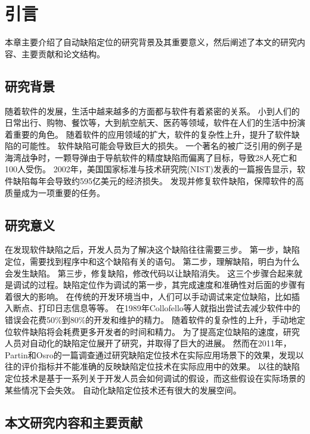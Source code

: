 \chapter{引言}

本章主要介绍了自动缺陷定位的研究背景及其重要意义，然后阐述了本文的研究内容、主要贡献和论文结构。

\section{研究背景}

随着软件的发展，生活中越来越多的方面都与软件有着紧密的关系。
小到人们的日常出行、购物、餐饮等，大到航空航天、医药等领域，软件在人们的生活中扮演着重要的角色。
随着软件的应用领域的扩大，软件的复杂性上升，提升了软件缺陷的可能性。
软件缺陷可能会导致巨大的损失。
一个著名的被广泛引用的例子是海湾战争时，一颗导弹由于导航软件的精度缺陷而偏离了目标，导致28人死亡和100人受伤\parencite{Zou2015A}。
2002年，美国国家标准与技术研究院(NIST)发表的一篇报告\parencite{NIST2002The}显示，软件缺陷每年会导致约595亿美元的经济损失。
发现并修复软件缺陷，保障软件的高质量成为一项重要的任务。

\section{研究意义}

在发现软件缺陷之后，开发人员为了解决这个缺陷往往需要三步\parencite{Parnin2011Are}。
第一步，缺陷定位，需要找到程序中和这个缺陷有关的语句。
第二步，理解缺陷，明白为什么会发生缺陷。
第三步，修复缺陷，修改代码以让缺陷消失。
这三个步骤合起来就是调试的过程。缺陷定位作为调试的第一步，其完成速度和准确性对后面的步骤有着很大的影响。
在传统的开发环境当中，人们可以手动调试来定位缺陷，比如插入断点、打印日志信息等等。
在1989年Collofello等人就指出尝试去减少软件中的错误会花费50\%到80\%的开发和维护的精力\parencite{Collofello1989Evaluating}。
随着软件的复杂性的上升，手动地定位软件缺陷将会耗费更多开发者的时间和精力。
为了提高定位缺陷的速度，研究人员对自动化的缺陷定位展开了研究，并取得了巨大的进展。
然而在2011年，Partin和Osro的一篇调查\parencite{Parnin2011Are}通过研究缺陷定位技术在实际应用场景下的效果，发现以往的评价指标并不能准确的反映缺陷定位技术在实际应用中的效果。
以往的缺陷定位技术是基于一系列关于开发人员会如何调试的假设，而这些假设在实际场景的某些情况下会失效。
自动化缺陷定位技术还有很大的发展空间。

\section{本文研究内容和主要贡献}

